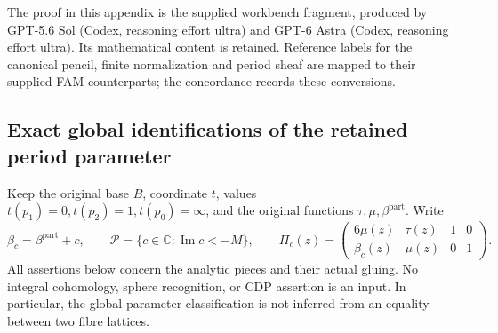 The proof in this appendix is the supplied workbench fragment, produced by GPT-5.6 Sol (Codex, reasoning effort ultra) and GPT-6 Astra (Codex, reasoning effort ultra). Its mathematical content is retained. Reference labels for the canonical pencil, finite normalization and period sheaf are mapped to their supplied FAM counterparts; the concordance records these conversions.
\subsection{Exact global identifications of the retained period parameter}
\label{pshift:sec:classification}

Keep the original base $B$, coordinate $t$, values
$t(p_1)=0,t(p_2)=1,t(p_0)=\infty$, and the original functions
$\tau,\mu,\beta^{\mathrm{part}}$. Write
\[
 \beta_c=\beta^{\mathrm{part}}+c,\qquad
 \mathcal P=\{c\in\mathbb C:\operatorname{Im}c<-M\},\qquad
 \Pi_c(z)=\begin{pmatrix}6\mu(z)&\tau(z)&1&0\\
                      \beta_c(z)&\mu(z)&0&1\end{pmatrix}.
 \tag{PS1}\label{pshift:eq:periods}
\]
All assertions below concern the analytic pieces and their actual gluing.
No integral cohomology, sphere recognition, or CDP assertion is an input.
In particular, the global parameter classification is not inferred from
an equality between two fibre lattices.

